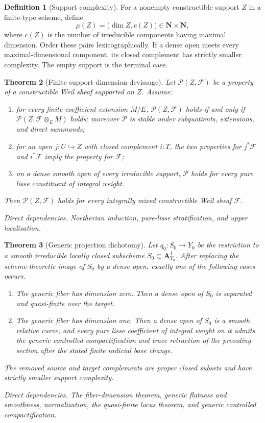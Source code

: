 \documentclass[10pt]{article}
\newtheorem{theorem}{Theorem}[section]
\theoremstyle{definition}
\newtheorem{definition}[theorem]{Definition}
\newcommand{\dep}[1]{\par\smallskip\noindent\textit{Direct dependencies.} #1\par}
\begin{document}
\begin{definition}[Support complexity]
For a nonempty constructible support \(Z\) in a finite-type scheme, define
\[
 \mu(Z)=\bigl(\dim Z,c(Z)\bigr)\in\mathbf N\times\mathbf N,
\]
where \(c(Z)\) is the number of irreducible components having maximal
dimension.  Order these pairs lexicographically.  If a dense open meets
every maximal-dimensional component, its closed complement has strictly
smaller complexity.  The empty support is the terminal case.
\end{definition}

\begin{theorem}[Finite support-dimension devissage]
Let \(\mathcal P(Z,\mathcal F)\) be a property of a constructible Weil sheaf
supported on \(Z\).  Assume:
\begin{enumerate}[label=\textup{(\roman*)}]
\item for every finite coefficient extension \(M/E\),
\(\mathcal P(Z,\mathcal F)\) holds if and only if
\(\mathcal P(Z,\mathcal F\otimes_E M)\) holds; moreover \(\mathcal P\) is
stable under subquotients, extensions, and direct summands;
\item for an open \(j:U\hookrightarrow Z\) with closed complement \(i:T\),
the two properties for \(j^*\mathcal F\) and \(i^*\mathcal F\) imply the
property for \(\mathcal F\);
\item on a dense smooth open of every irreducible support, \(\mathcal P\)
holds for every pure lisse constituent of integral weight.
\end{enumerate}
Then \(\mathcal P(Z,\mathcal F)\) holds for every integrally mixed
constructible Weil sheaf \(\mathcal F\).
\dep{Noetherian induction, pure-lisse stratification, and upper
localization.}
\end{theorem}

\begin{theorem}[Generic projection dichotomy]
Let \(q_0:S_0\to Y_0\) be the restriction to a smooth irreducible locally
closed subscheme \(S_0\subset\mathbf A^1_{Y_0}\).  After replacing the
scheme-theoretic image of \(S_0\) by a dense open, exactly one of the
following cases occurs.
\begin{enumerate}[label=\textup{(\roman*)}]
\item The generic fiber has dimension zero.  Then a dense open of \(S_0\)
is separated and quasi-finite over the target.
\item The generic fiber has dimension one.  Then a dense open of \(S_0\)
is a smooth relative curve, and every pure lisse coefficient of integral
weight on it admits
the generic controlled compactification and trace retraction of the
preceding section after the stated finite radicial base change.
\end{enumerate}
The removed source and target complements are proper closed subsets and
have strictly smaller support complexity.
\dep{The fiber-dimension theorem, generic flatness and smoothness,
normalization, the quasi-finite locus theorem, and generic controlled
compactification.}
\end{theorem}
\end{document}
